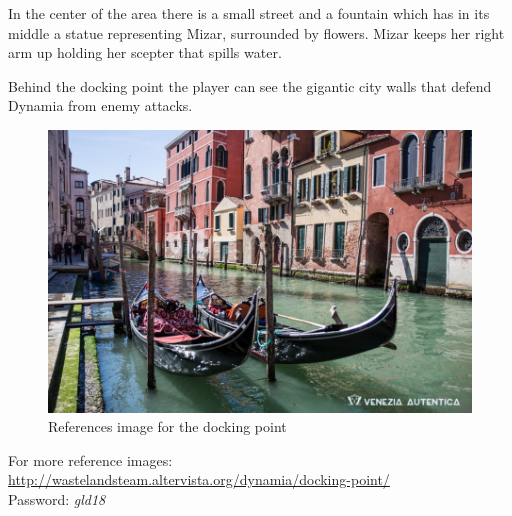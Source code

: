 In the center of the area there is a small street and a fountain which has in its middle a statue representing Mizar, surrounded by flowers. Mizar keeps her right arm up holding her scepter that spills water.

Behind the docking point the player can see the gigantic city walls that defend Dynamia from enemy attacks.

\begin{figure}[H]
  \centering
  \includegraphics[width=\textwidth]{Images/Landmarks/dockingPoint}
  \caption{References image for the docking point}
\end{figure}
For more reference images: \url{http://wastelandsteam.altervista.org/dynamia/docking-point/}\\
Password: \textit{gld18}
